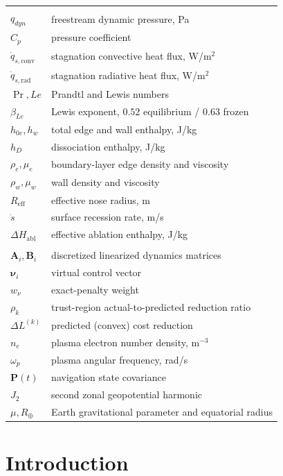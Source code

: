 \documentclass[11pt,a4paper]{article}
\theoremstyle{definition}
\numberwithin{equation}{section}
\begin{document}
\begin{longtable}{@{}ll@{}}
\addlinespace
\multicolumn{2}{@{}l}{\textit{Aerothermodynamics}} \\
$q_{dyn}$ & freestream dynamic pressure, Pa \\
$C_p$ & pressure coefficient \\
$\dot{q}_{s,\text{conv}}$ & stagnation convective heat flux, W/m$^2$ \\
$\dot{q}_{s,\text{rad}}$ & stagnation radiative heat flux, W/m$^2$ \\
$\Pr, Le$ & Prandtl and Lewis numbers \\
$\beta_{Le}$ & Lewis exponent, $0.52$ equilibrium / $0.63$ frozen \\
$h_{0e}, h_w$ & total edge and wall enthalpy, J/kg \\
$h_D$ & dissociation enthalpy, J/kg \\
$\rho_e, \mu_e$ & boundary-layer edge density and viscosity \\
$\rho_w, \mu_w$ & wall density and viscosity \\
$R_{\text{eff}}$ & effective nose radius, m \\
$\dot{s}$ & surface recession rate, m/s \\
$\Delta H_{\text{abl}}$ & effective ablation enthalpy, J/kg \\
\addlinespace
\multicolumn{2}{@{}l}{\textit{GNC and orbital}} \\
$\mathbf{A}_i, \mathbf{B}_i$ & discretized linearized dynamics matrices \\
$\bm{\nu}_i$ & virtual control vector \\
$w_\nu$ & exact-penalty weight \\
$\rho_k$ & trust-region actual-to-predicted reduction ratio \\
$\Delta L^{(k)}$ & predicted (convex) cost reduction \\
$n_e$ & plasma electron number density, m$^{-3}$ \\
$\omega_p$ & plasma angular frequency, rad/s \\
$\mathbf{P}(t)$ & navigation state covariance \\
$J_2$ & second zonal geopotential harmonic \\
$\mu, R_\oplus$ & Earth gravitational parameter and equatorial radius \\
\bottomrule
\end{longtable}

\pagebreak

\section{Introduction}
\label{sec:intro}
\end{document}
